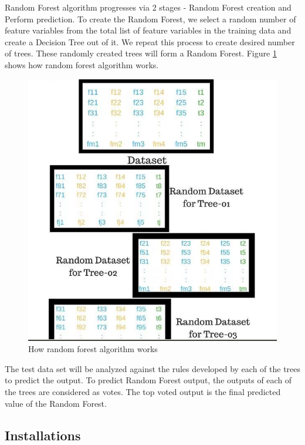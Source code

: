 \documentclass[sigconf]{acmart}
\begin{document}
Random Forest algorithm progresses via 2 stages - Random Forest creation and Perform prediction. To create the Random Forest, we select a random number of feature variables from the total list of feature variables in the training data and create a Decision Tree out of it. We repeat this process to create desired number of trees. These randomly created trees will form a Random Forest. Figure \ref{fig:Figure4} shows how random forest algorithm works. 

\begin{figure}[htb]
  \centering
  \includegraphics[width=1.0\columnwidth]{images/Figure4.png}
  \caption{How random forest algorithm works
  \cite{random-forest}}
  \label{fig:Figure4} 
\end{figure}

The test data set will be analyzed against the rules developed by each of the trees to predict the output. To predict Random Forest output, the outputs of each of the trees are considered as votes. The top voted output is the final predicted value of the Random Forest.


\subsection{Installations}
\end{document}
